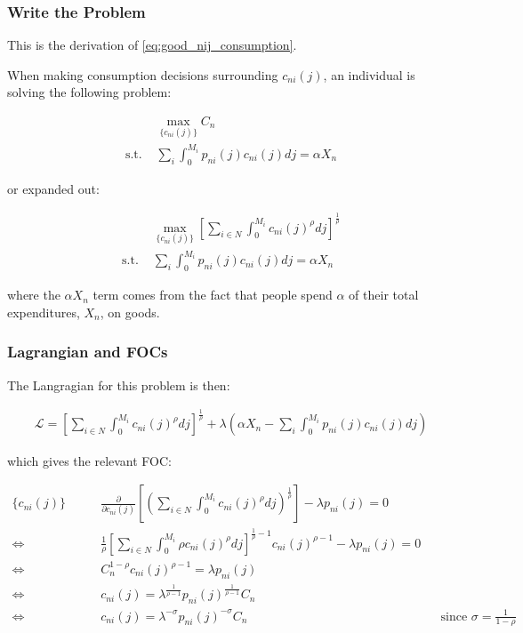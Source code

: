 \documentclass[10pt]{article}
\begin{document}
\subsubsection{Write the Problem}
This is the derivation of \eqref{eq:good_nij_consumption}.

When making consumption decisions surrounding
$c_{n i}(j)$, an individual is solving the following problem:

\begin{align}
    &\underset{\{c_{n i}(j)\}}{\max} C_n \\ 
    \text{s.t. } &\sum_i \int_{0}^{M_i} p_{n i}(j) c_{n i}(j) d j=\alpha X_n
\end{align}

or expanded out:

\begin{align}
    &\underset{\{c_{n i}(j)\}}{\max} \left[\sum_{i \in N} \int_0^{M_i} c_{n i}(j)^\rho d j\right]^{\frac{1}{\rho}} \\
    \text{s.t. } &\sum_i \int_{0}^{M_i} p_{n i}(j) c_{n i}(j) d j=\alpha X_n
\end{align}

where the $\alpha X_n$ term comes from the fact that 
people spend $\alpha$ of their total expenditures, $X_n$,
on goods.

\subsubsection{Lagrangian and FOCs}

The Langragian for this problem is then:

\begin{align}
    \mathcal{L} = \left[\sum_{i \in N} \int_0^{M_i} c_{n i}(j)^\rho d j\right]^{\frac{1}{\rho}} + \lambda \left(\alpha X_n - \sum_i \int_{0}^{M_i} p_{n i}(j) c_{n i}(j) d j\right)
\end{align}

which gives the relevant FOC:

\begin{align}
    \{c_{n i}(j)\} \quad \quad &\frac{\partial}{\partial c_{n i}(j)} \left[\left(\sum_{i \in N} \int_0^{M_i} c_{n i}(j)^\rho d j\right)^{\frac{1}{\rho}}\right] - \lambda p_{n i}(j) = 0 \\
    \Leftrightarrow & \frac{1}{\rho} \left[\sum_{i \in N} \int_0^{M_i} \rho c_{n i}(j)^\rho d j\right]^{\frac{1}{\rho}-1} c_{n i}(j)^{\rho-1} - \lambda p_{n i}(j) = 0 \\
    \Leftrightarrow & C_n^{1-\rho} c_{n i}(j)^{\rho-1} = \lambda p_{n i}(j) \\
    \Leftrightarrow & c_{n i}(j) = \lambda^{\frac{1}{\rho -1}} p_{ni}(j)^{\frac{1}{\rho -1}} C_n \\ 
    \Leftrightarrow & c_{n i}(j) = \lambda^{-\sigma} p_{ni}(j)^{-\sigma} C_n && \text{since $\sigma = \frac{1}{1-\rho}$} \label{eq:inter_good_nij_cons}
\end{align}
\end{document}
